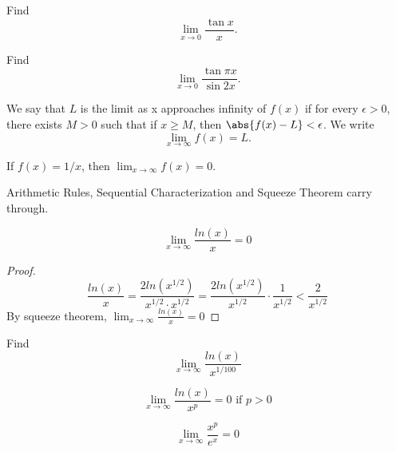 \begin{exmp}
Find \[\lim_{x\to 0} \frac{\tan x}{x}.\]
\end{exmp}

\begin{exmp}
Find \[\lim_{x\to 0} \frac{\tan \pi x}{\sin 2x}.\]
\end{exmp}



\begin{defn}
We say that $L$ is the limit as x approaches infinity of $f(x)$ if for every $\epsilon > 0$, there exists $M>0$ such that if $x\geq M$, then $\abs{f(x) - L}< \epsilon$. We write \[\lim_{x\to\infty} f(x) = L.\]
\end{defn}

\begin{exmp}
If $f(x) = 1/x$, then $\lim_{x\to\infty} f(x) = 0$.
\end{exmp}

\begin{note}
Arithmetic Rules, Sequential Characterization and Squeeze Theorem carry through.
\end{note}

\begin{thm}
\[\lim_{x\to\infty}\frac{ln(x)}{x} = 0\]
\end{thm}

\begin{proof}
\[\frac{ln(x)}{x} = \frac{2ln(x^{1/2})}{x^{1/2}\cdot x^{1/2}} = \frac{2ln(x^{1/2})}{x^{1/2}} \cdot \frac{1}{x^{1/2}} <\frac{2}{x^{1/2}}\]
By squeeze theorem, $\lim_{x\to\infty}\frac{ln(x)}{x} = 0$
\end{proof}

\begin{exmp}
Find \[\lim_{x\to\infty} \frac{ln(x)}{x^{1/100}}\]
\end{exmp}

\begin{note}
\[\lim_{x\to\infty} \frac{ln(x)}{x^p} = 0 \text{ if } p>0\]
\end{note}

\begin{exmp}
\[\lim_{x\to\infty} \frac{x^p}{e^x} = 0\]
\end{exmp}